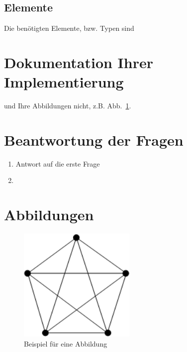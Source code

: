\documentclass[a4paper]{article}
\begin{document}
\subsection{Elemente}

Die benötigten Elemente, bzw. Typen sind 

\section{Dokumentation Ihrer Implementierung}

\newpage

\cite{KN2012} 
und Ihre Abbildungen nicht, z.B. Abb.~\ref{fig:bild}.
  

\section{Beantwortung der  Fragen}
\begin{enumerate}
						\item Antwort auf die erste Frage
						\item 
					\end{enumerate}


\section*{Abbildungen}


\begin{figure}[h]
	\centering
		\includegraphics[width=0.50\textwidth]{Figs/Bild.png}		
	\caption{Beispiel für eine Abbildung}
	\label{fig:bild}
\end{figure}





%
\end{document}
